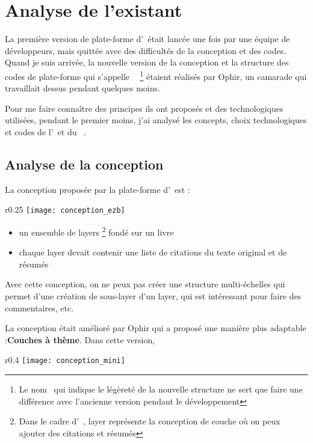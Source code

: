 \section{Analyse de l'existant}

La première version de plate-forme d’\ezb\ était lancée une fois par une équipe de développeurs, mais quittée avec des difficultés de la conception et des codes. Quand je suis arrivée, la nouvelle version de la conception et la structure des codes de plate-forme qui s'appelle \textbf{\mini\ } \footnote{Le nom \mini\ qui indique le légèreté de la nouvelle structure ne sert que faire une différence avec l'ancienne version pendant le développement} étaient réalisés par Ophir, un camarade qui travaillait dessus pendant quelques moins. 

Pour me faire connaître des principes ils ont proposés et des technologiques utilisées, pendant le premier moins, j’ai analysé les concepts, choix technologiques et codes de l'\ezb\ et du \mini\ .  

\subsection{Analyse de la conception}
La conception proposée par la plate-forme d’\ezb\ est :
\begin{wrapfigure}{r}{0.25\textwidth}
    \centering
    \texttt{[image: conception\_ezb]}
\end{wrapfigure}
\begin{itemize}
    \item un ensemble de layers \footnote{Dans le cadre d'\ezb\ , layer représente la conception de couche où on peux ajouter des citations et résumés} fondé sur un livre
    \item chaque layer devait contenir une liste de citations du texte original et de résumés
\end{itemize}
Avec cette conception, on ne peux pas créer une structure multi-échelles qui permet d'une création de sous-layer d'un layer, qui est intéressant pour faire des commentaires, etc.

La conception était amélioré par Ophir qui a proposé une manière plus adaptable :\textbf{Couches à thème}. Dans cette version, 

\begin{wrapfigure}{r}{0.4\textwidth}
    \centering
    \texttt{[image: conception\_mini]}
\end{wrapfigure}

